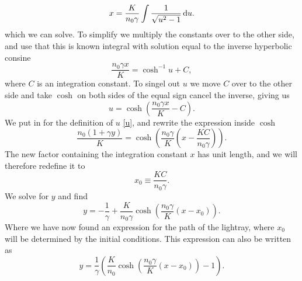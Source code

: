 \documentclass[12pt,twoside]{article}
\begin{document}
\begin{equation}
   x = \frac{K}{n_0\gamma}\int \frac{1}{\sqrt{u^2-1}} \dif u.
\end{equation}
which we can solve. To simplify we multiply the constants over to the other side, and use that this is known integral with solution equal to the inverse hyperbolic consine
\begin{equation}
   \frac{n_0\gamma x}{K} = \cosh^{-1}{u} + C,
\end{equation}
where $C$ is an integration constant. To singel out $u$ we move $C$ over to the other side and take $\cosh{}$ on both sides of the equal sign cancel the inverse, giving us
\begin{equation}
   u = \cosh{\left(\frac{n_0\gamma x}{K}-C\right)}.
\end{equation}
We put in for the definition of $u$ \eqref{u}, and rewrite the expression inside $\cosh{}$
\begin{equation}
   \frac{n_0\left(1+\gamma y\right)}{K} = \cosh{\left(\frac{n_0\gamma}{K}\left(x-\frac{KC}{n_0\gamma}\right)\right)}.
\end{equation}
The new factor containing the integration constant $x$ has unit length, and we will therefore redefine it to
\begin{equation}
  x_0 \equiv \frac{KC}{n_0\gamma} .
\end{equation}
We solve for $y$ and find
\begin{equation}
   y = -\frac{1}{\gamma} + \frac{K}{n_0\gamma}\cosh{\left(\frac{n_0\gamma}{K}\left(x-x_0\right)\right)}.
\end{equation}
Where we have now found an expression for the path of the lightray, where $x_0$ will be determined by the initial conditions. This expression can also be written as
\begin{equation}
   y = \frac{1}{\gamma}\left(\frac{K}{n_0}\cosh{\left(\frac{n_0\gamma}{K}\left(x-x_0\right)\right)}-1\right). \label{2b}
\end{equation}
\end{document}

